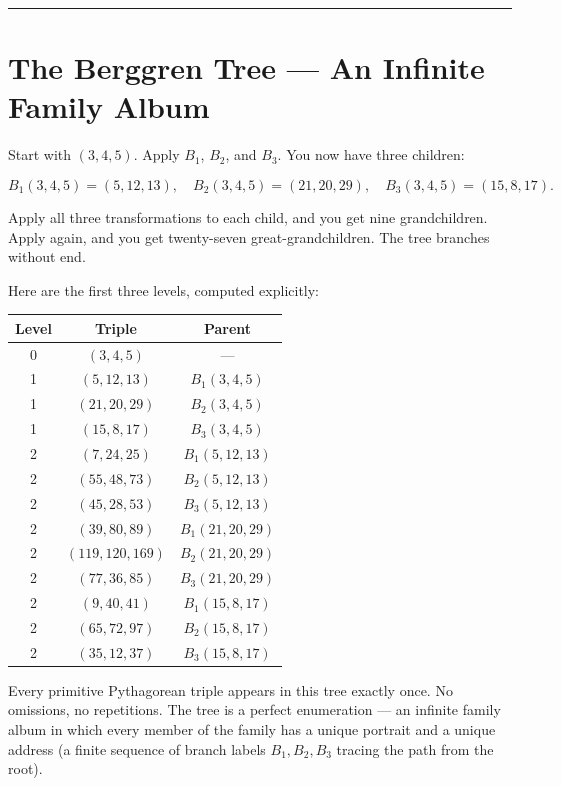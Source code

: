 \documentclass[12pt, letterpaper, openany]{book}
\theoremstyle{definition}
\theoremstyle{remark}
\begin{document}
\bigskip\noindent\rule{\textwidth}{0.4pt}\bigskip



\section*{The Berggren Tree --- An Infinite Family Album}


Start with $(3, 4, 5)$. Apply $B_1$, $B_2$, and $B_3$. You now have three children:

\[
B_1(3, 4, 5) = (5, 12, 13), \quad B_2(3, 4, 5) = (21, 20, 29), \quad B_3(3, 4, 5) = (15, 8, 17).
\]

Apply all three transformations to each child, and you get nine grandchildren. Apply again, and you get twenty-seven great-grandchildren. The tree branches without end.

Here are the first three levels, computed explicitly:


\begin{center}
\begin{tabular}{|c|c|c|}
\hline
Level & Triple & Parent \\
\hline
0 & $(3, 4, 5)$ & --- \\
1 & $(5, 12, 13)$ & $B_1(3,4,5)$ \\
1 & $(21, 20, 29)$ & $B_2(3,4,5)$ \\
1 & $(15, 8, 17)$ & $B_3(3,4,5)$ \\
2 & $(7, 24, 25)$ & $B_1(5,12,13)$ \\
2 & $(55, 48, 73)$ & $B_2(5,12,13)$ \\
2 & $(45, 28, 53)$ & $B_3(5,12,13)$ \\
2 & $(39, 80, 89)$ & $B_1(21,20,29)$ \\
2 & $(119, 120, 169)$ & $B_2(21,20,29)$ \\
2 & $(77, 36, 85)$ & $B_3(21,20,29)$ \\
2 & $(9, 40, 41)$ & $B_1(15,8,17)$ \\
2 & $(65, 72, 97)$ & $B_2(15,8,17)$ \\
2 & $(35, 12, 37)$ & $B_3(15,8,17)$ \\
\hline
\end{tabular}
\end{center}


Every primitive Pythagorean triple appears in this tree exactly once. No omissions, no repetitions. The tree is a perfect enumeration --- an infinite family album in which every member of the family has a unique portrait and a unique address (a finite sequence of branch labels $B_1, B_2, B_3$ tracing the path from the root).
\end{document}
